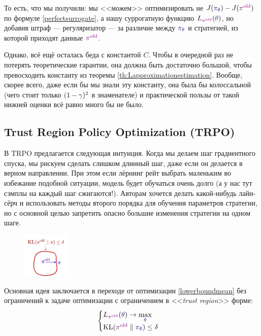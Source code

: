 То есть, что мы получили: мы <<можем>> оптимизировать не $J(\textcolor{ChadBlue}{\pi_\theta}) - J(\textcolor{ChadPurple}{\pi^{\old}})$ по формуле \eqref{perfectsurrogate}, а нашу суррогатную функцию $L_{\textcolor{ChadPurple}{\pi^{\old}}}(\textcolor{ChadBlue}{\theta})$, но добавив штраф --- регуляризатор --- за различие между $\textcolor{ChadBlue}{\pi_\theta}$ и стратегией, из которой приходят данные $\textcolor{ChadPurple}{\pi^{\old}}$.

Однако, всё ещё осталась беда с константой $C$. Чтобы в очередной раз не потерять теоретические гарантии, она должна быть достаточно большой, чтобы превосходить константу из теоремы \ref{th:Lapproximationestimation}. Вообще, скорее всего, даже если бы мы знали эту константу, она была бы колоссальной (чего стоит только $(1 \HM- \gamma)^2$ в знаменателе) и практической пользы от такой нижней оценки всё равно много бы не было.

\subsection{Trust Region Policy Optimization (TRPO)}

В TRPO предлагается следующая интуиция. Когда мы делаем шаг градиентного спуска, мы рискуем сделать слишком длинный шаг, даже если он делается в верном направлении. При этом если лёрнинг рейт выбрать маленьким во избежание подобной ситуации, модель будет обучаться очень долго (а у нас тут сэмплы на каждый шаг сжигаются!). Авторам хочется делать какой-нибудь лайн-сёрч и использовать методы второго порядка для обучения параметров стратегии, но с основной целью запретить опасно большие изменения стратегии на одном шаге.

\begin{figure}
\vspace{-0.5cm}
\centering
\includegraphics[width=0.2\textwidth]{Images/HardTrustRegion.png}
\vspace{-0.9cm}
\end{figure}

Основная идея заключается в переходе от оптимизации \eqref{lowerboundmean} без ограничений к задаче оптимизации с ограничением в <<\emph{trust region}>> форме:
\begin{equation}\label{trustregion}
\begin{cases}
L_{\textcolor{ChadPurple}{\pi^{\old}}}(\textcolor{ChadBlue}{\theta}) \to \max\limits_{\textcolor{ChadBlue}{\theta}} \\
\KL(\textcolor{ChadPurple}{\pi^{\old}} \parallel \textcolor{ChadBlue}{\pi_\theta}) \le \delta
\end{cases}
\end{equation}

